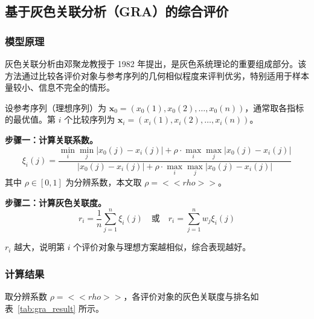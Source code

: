 
\subsection{基于灰色关联分析（GRA）的综合评价}

\subsubsection{模型原理}

灰色关联分析由邓聚龙教授于 1982 年提出，是灰色系统理论的重要组成部分。该方法通过比较各评价对象与参考序列的几何相似程度来评判优劣，特别适用于样本量较小、信息不完全的情形。

设参考序列（理想序列）为 $\mathbf{x}_0 = (x_0(1), x_0(2), \ldots, x_0(n))$，通常取各指标的最优值。第 $i$ 个比较序列为 $\mathbf{x}_i = (x_i(1), x_i(2), \ldots, x_i(n))$。

\textbf{步骤一：计算关联系数。}
\begin{equation}
    \xi_i(j) = \frac{\min_i \min_j |x_0(j) - x_i(j)| + \rho \cdot \max_i \max_j |x_0(j) - x_i(j)|}{|x_0(j) - x_i(j)| + \rho \cdot \max_i \max_j |x_0(j) - x_i(j)|}
    \label{eq:gra_coefficient}
\end{equation}
其中 $\rho \in [0, 1]$ 为分辨系数，本文取 $\rho = << rho >>$。

\textbf{步骤二：计算灰色关联度。}
\begin{equation}
    r_i = \frac{1}{n} \sum_{j=1}^{n} \xi_i(j) \quad \text{或} \quad r_i = \sum_{j=1}^{n} w_j \xi_i(j)
    \label{eq:gra_degree}
\end{equation}

$r_i$ 越大，说明第 $i$ 个评价对象与理想方案越相似，综合表现越好。

\subsubsection{计算结果}

取分辨系数 $\rho = << rho >>$，各评价对象的灰色关联度与排名如表~\ref{tab:gra_result} 所示。

